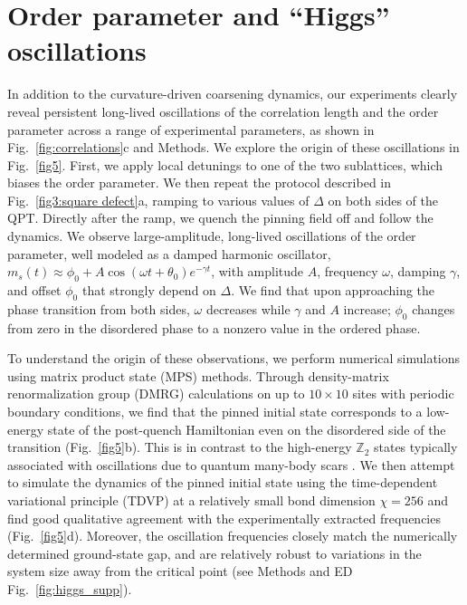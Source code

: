 \documentclass[reprint,twocolumn,secnumarabic,amssymb, aps, prx]{revtex4-2}
\begin{document}
\section*{Order parameter and ``Higgs'' oscillations}
\label{sec:amplitude}
In addition to the curvature-driven coarsening dynamics, our experiments clearly reveal persistent long-lived oscillations of the correlation length and the order parameter across a range of experimental parameters, as shown in Fig.~\ref{fig:correlations}c and Methods. We explore the origin of these oscillations in Fig.~\ref{fig5}. First, we apply local detunings to one of the two sublattices, which biases the order parameter. We then repeat the protocol described in Fig.~\ref{fig3:square defect}a, ramping to various values of $\Delta$ on both sides of the QPT. Directly after the ramp, we quench the pinning field off and follow the dynamics. We observe large-amplitude, long-lived oscillations of the order parameter, well modeled as a damped harmonic oscillator, $m_s(t) \approx \phi_0+A \cos{(\omega t+\theta_0)}e^{-\gamma t}$, with amplitude $A$, frequency $\omega$, damping $\gamma$, and offset $\phi_0$ that strongly depend on $\Delta$. We find that upon approaching the phase transition from both sides, $\omega$ decreases while $\gamma$ and $A$ increase; $\phi_0$ changes from zero in the disordered phase to a nonzero value in the ordered phase. 

To understand  the origin of these observations, we perform numerical simulations using matrix product state (MPS) methods. 
Through density-matrix renormalization group (DMRG) calculations on up to $10\times 10$ sites with periodic boundary conditions, we find that the pinned initial state corresponds to a low-energy state of the post-quench Hamiltonian even on the disordered side of the transition (Fig.~\ref{fig5}b). 
This is in contrast to the high-energy $\mathbb{Z}_2$ states typically associated with oscillations due to quantum many-body scars \cite{bernien2017probing,bluvstein2021controlling}.
We then attempt to simulate the dynamics of the pinned initial state using the time-dependent variational principle (TDVP) \cite{haegeman2016tdvp} at a relatively small bond dimension $\chi=256$ and find good qualitative agreement with the experimentally extracted frequencies (Fig.~\ref{fig5}d). 
Moreover, the oscillation frequencies closely match the numerically determined ground-state gap, and are relatively robust to variations in the system size away from the critical point (see Methods and ED Fig.~\ref{fig:higgs_supp}). 
\end{document}
